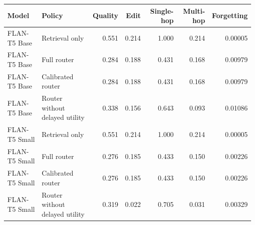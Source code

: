\begin{tabular}{llrrrrr}
\toprule
Model & Policy & Quality & Edit & Single-hop & Multi-hop & Forgetting \\
\midrule
FLAN-T5 Base & Retrieval only & 0.551 & 0.214 & 1.000 & 0.214 & 0.00005 \\
FLAN-T5 Base & Full router & 0.284 & 0.188 & 0.431 & 0.168 & 0.00979 \\
FLAN-T5 Base & Calibrated router & 0.284 & 0.188 & 0.431 & 0.168 & 0.00979 \\
FLAN-T5 Base & Router without delayed utility & 0.338 & 0.156 & 0.643 & 0.093 & 0.01086 \\
FLAN-T5 Small & Retrieval only & 0.551 & 0.214 & 1.000 & 0.214 & 0.00005 \\
FLAN-T5 Small & Full router & 0.276 & 0.185 & 0.433 & 0.150 & 0.00226 \\
FLAN-T5 Small & Calibrated router & 0.276 & 0.185 & 0.433 & 0.150 & 0.00226 \\
FLAN-T5 Small & Router without delayed utility & 0.319 & 0.022 & 0.705 & 0.031 & 0.00329 \\
\bottomrule
\end{tabular}
